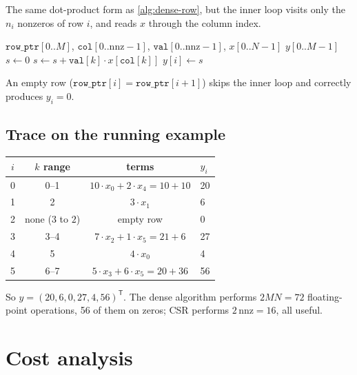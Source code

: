 \documentclass[11pt,a4paper]{article}
\newcommand{\id}[1]{\texttt{#1}}
\newcommand{\nnz}{\mathrm{nnz}}
\begin{document}
The same dot-product form as \cref{alg:dense-row}, but the inner loop visits
only the $n_i$ nonzeros of row $i$, and reads $x$ through the column index.

\begin{algorithm}[H]
\caption{CSR $y = Ax$}
\label{alg:csr}
\begin{algorithmic}[1]
\Require $\id{row\_ptr}[0..M]$, $\id{col}[0..\nnz-1]$, $\id{val}[0..\nnz-1]$, $x[0..N-1]$
\Ensure $y[0..M-1]$
  \State $s \gets 0$
  \For{$k \gets \id{row\_ptr}[i]$ \textbf{to} $\id{row\_ptr}[i+1]-1$}
    \State $s \gets s + \id{val}[k] \cdot x[\id{col}[k]]$ 
  \EndFor
  \State $y[i] \gets s$
\EndFor
\end{algorithmic}
\end{algorithm}

\noindent An empty row ($\id{row\_ptr}[i] = \id{row\_ptr}[i+1]$) skips the
inner loop and correctly produces $y_i = 0$.

\subsection{Trace on the running example}

\begin{center}
\begin{tabular}{cccl}
\toprule
$i$ & $k$ range & terms & $y_i$ \\
\midrule
0 & 0--1 & $10\cdot x_0 + 2\cdot x_4 = 10 + 10$ & 20 \\
1 & 2 & $3\cdot x_1$ & 6 \\
2 & none ($3$ to $2$) & empty row & 0 \\
3 & 3--4 & $7\cdot x_2 + 1\cdot x_5 = 21 + 6$ & 27 \\
4 & 5 & $4\cdot x_0$ & 4 \\
5 & 6--7 & $5\cdot x_3 + 6\cdot x_5 = 20 + 36$ & 56 \\
\bottomrule
\end{tabular}
\end{center}

\noindent So $y = (20, 6, 0, 27, 4, 56)^{\mathsf T}$. The dense algorithm
performs $2MN = 72$ floating-point operations, 56 of them on zeros; CSR
performs $2\,\nnz = 16$, all useful.

\section{Cost analysis}
\end{document}

